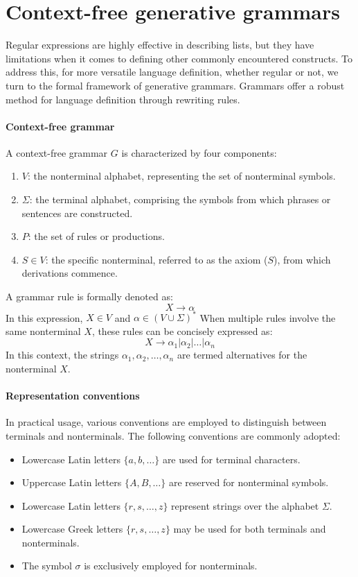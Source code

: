 \section{Context-free generative grammars}

Regular expressions are highly effective in describing lists, but they have limitations when it comes to defining other commonly encountered constructs. 
To address this, for more versatile language definition, whether regular or not, we turn to the formal framework of generative grammars.
Grammars offer a robust method for language definition through rewriting rules.

\paragraph*{Context-free grammar}
A context-free grammar $G$ is characterized by four components:
\begin{enumerate}
    \item $V$: the nonterminal alphabet, representing the set of nonterminal symbols.
    \item $\Sigma$: the terminal alphabet, comprising the symbols from which phrases or sentences are constructed.
    \item $P$: the set of rules or productions.
    \item $S \in V$: the specific nonterminal, referred to as the axiom ($S$), from which derivations commence.
\end{enumerate}
A grammar rule is formally denoted as:
\[X \rightarrow \alpha\]
In this expression, $X \in V$ and $\alpha \in (V \cup \Sigma)^{*}$
When multiple rules involve the same nonterminal $X$, these rules can be concisely expressed as:
\[X \rightarrow \alpha_1 | \alpha_2 | \dots | \alpha_n\]
In this context, the strings $\alpha_1,\alpha_2,\dots,\alpha_n$ are termed alternatives for the nonterminal $X$.

\paragraph*{Representation conventions}
In practical usage, various conventions are employed to distinguish between terminals and nonterminals. 
The following conventions are commonly adopted:
\begin{itemize}
    \item Lowercase Latin letters $\{a,b,\dots\}$ are used for terminal characters.
    \item Uppercase Latin letters $\{A,B,\dots\}$ are reserved for nonterminal symbols.
    \item Lowercase Latin letters $\{r,s,\dots,z\}$ represent strings over the alphabet $\Sigma$.
    \item Lowercase Greek letters $\{r,s,\dots,z\}$ may be used for both terminals and nonterminals.
    \item The symbol $\sigma$ is exclusively employed for nonterminals.
\end{itemize}

